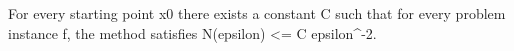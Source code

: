 For every starting point x0 there exists a constant C such that for every problem instance f, the method satisfies N(epsilon) <= C epsilon^{-2}.
